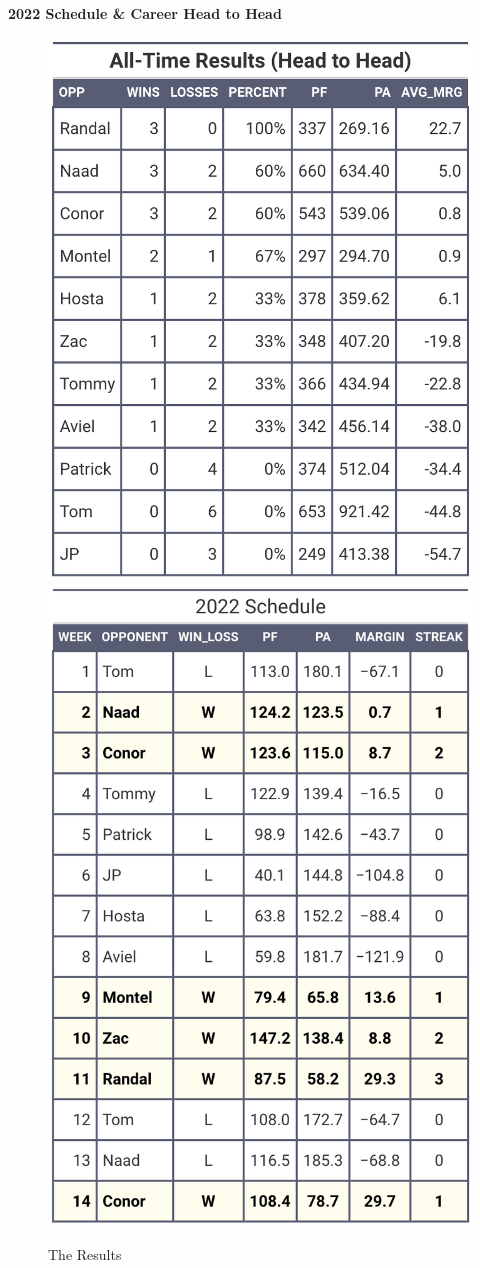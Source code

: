 \documentclass[
]{article}
\begin{document}
\textbf{2022 Schedule \& Career Head to Head}

\begin{figure}
\includegraphics[width=0.5\linewidth,height=0.5\textheight]{output/headtohead/Logan_head_to_head} \includegraphics[width=0.5\linewidth,height=0.5\textheight]{output/py_schedule/season_results_Logan} \caption{The Results}\label{fig:unnamed-chunk-40}
\end{figure}
\end{document}
